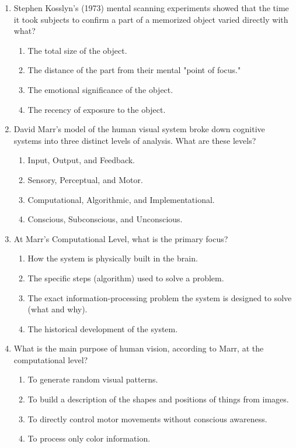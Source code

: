 \documentclass{article}
\begin{document}
\begin{enumerate}[label=\arabic*.]
\item Stephen Kosslyn's (1973) mental scanning experiments showed that the time it took subjects to confirm a part of a memorized object varied directly with what?
\begin{enumerate}[label=(\alph*)]
    \item The total size of the object.
    \item The distance of the part from their mental "point of focus."
    \item The emotional significance of the object.
    \item The recency of exposure to the object.
\end{enumerate}

\item David Marr's model of the human visual system broke down cognitive systems into three distinct levels of analysis. What are these levels?
\begin{enumerate}[label=(\alph*)]
    \item Input, Output, and Feedback.
    \item Sensory, Perceptual, and Motor.
    \item Computational, Algorithmic, and Implementational.
    \item Conscious, Subconscious, and Unconscious.
\end{enumerate}

\item At Marr's Computational Level, what is the primary focus?
\begin{enumerate}[label=(\alph*)]
    \item How the system is physically built in the brain.
    \item The specific steps (algorithm) used to solve a problem.
    \item The exact information-processing problem the system is designed to solve (what and why).
    \item The historical development of the system.
\end{enumerate}

\item What is the main purpose of human vision, according to Marr, at the computational level?
\begin{enumerate}[label=(\alph*)]
    \item To generate random visual patterns.
    \item To build a description of the shapes and positions of things from images.
    \item To directly control motor movements without conscious awareness.
    \item To process only color information.
\end{enumerate}


\end{enumerate}
\end{document}
